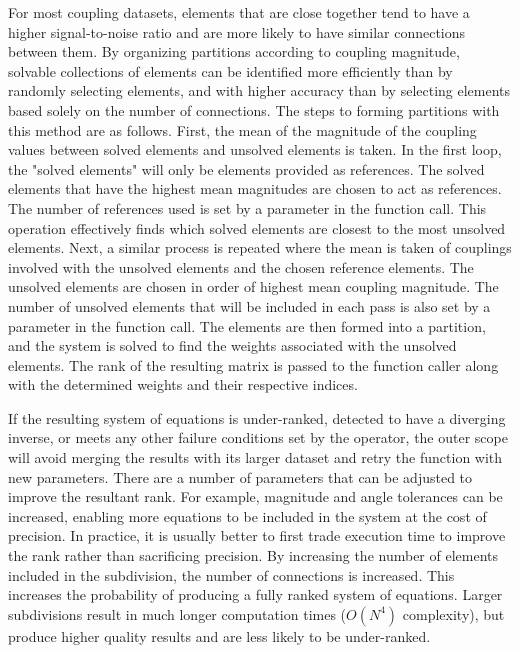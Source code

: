 \documentclass[journal]{IEEEtran}
\begin{document}
For most coupling datasets, elements that are close together tend to have a higher signal-to-noise ratio and are more likely to have similar connections between them. By organizing partitions according to coupling magnitude, solvable collections of elements can be identified more efficiently than by randomly selecting elements, and with higher accuracy than by selecting elements based solely on the number of connections. The steps to forming partitions with this method are as follows. First, the mean of the magnitude of the coupling values between solved elements and unsolved elements is taken. In the first loop, the "solved elements" will only be elements provided as references. The solved elements that have the highest mean magnitudes are chosen to act as references. The number of references used is set by a parameter in the function call. This operation effectively finds which solved elements are closest to the most unsolved elements. Next, a similar process is repeated where the mean is taken of couplings involved with the unsolved elements and the chosen reference elements. The unsolved elements are chosen in order of highest mean coupling magnitude. The number of unsolved elements that will be included in each pass is also set by a parameter in the function call. The elements are then formed into a partition, and the system is solved to find the weights associated with the unsolved elements. The rank of the resulting matrix is passed to the function caller along with the determined weights and their respective indices. 

If the resulting system of equations is under-ranked, detected to have a diverging inverse, or meets any other failure conditions set by the operator, the outer scope will avoid merging the results with its larger dataset and retry the function with new parameters. There are a number of parameters that can be adjusted to improve the resultant rank. For example, magnitude and angle tolerances can be increased, enabling more equations to be included in the system at the cost of precision. In practice, it is usually better to first trade execution time to improve the rank rather than sacrificing precision. By increasing the number of elements included in the subdivision, the number of connections is increased. This increases the probability of producing a fully ranked system of equations. Larger subdivisions result in much longer computation times ($O(N^4)$ complexity), but produce higher quality results and are less likely to be under-ranked. 
\end{document}
